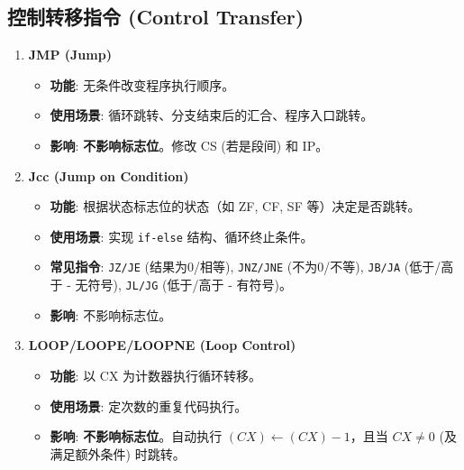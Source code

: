 \documentclass[12pt,a4paper]{ctexart}
\begin{document}
\subsection{控制转移指令 (Control Transfer)}
\begin{enumerate}
    \item \textbf{JMP (Jump)}
    \begin{itemize}
        \item \textbf{功能}: 无条件改变程序执行顺序。
        \item \textbf{使用场景}: 循环跳转、分支结束后的汇合、程序入口跳转。
        \item \textbf{影响}: \textbf{不影响标志位}。修改 CS (若是段间) 和 IP。
    \end{itemize}
    \item \textbf{Jcc (Jump on Condition)}
    \begin{itemize}
        \item \textbf{功能}: 根据状态标志位的状态（如 ZF, CF, SF 等）决定是否跳转。
        \item \textbf{使用场景}: 实现 \texttt{if-else} 结构、循环终止条件。
        \item \textbf{常见指令}: \texttt{JZ/JE} (结果为0/相等), \texttt{JNZ/JNE} (不为0/不等), \texttt{JB/JA} (低于/高于 - 无符号), \texttt{JL/JG} (低于/高于 - 有符号)。
        \item \textbf{影响}: 不影响标志位。
    \end{itemize}
    \item \textbf{LOOP/LOOPE/LOOPNE (Loop Control)}
    \begin{itemize}
        \item \textbf{功能}: 以 CX 为计数器执行循环转移。
        \item \textbf{使用场景}: 定次数的重复代码执行。
        \item \textbf{影响}: \textbf{不影响标志位}。自动执行 $(CX) \gets (CX) - 1$，且当 $CX \neq 0$ (及满足额外条件) 时跳转。
    \end{itemize}
\end{enumerate}
\end{document}
